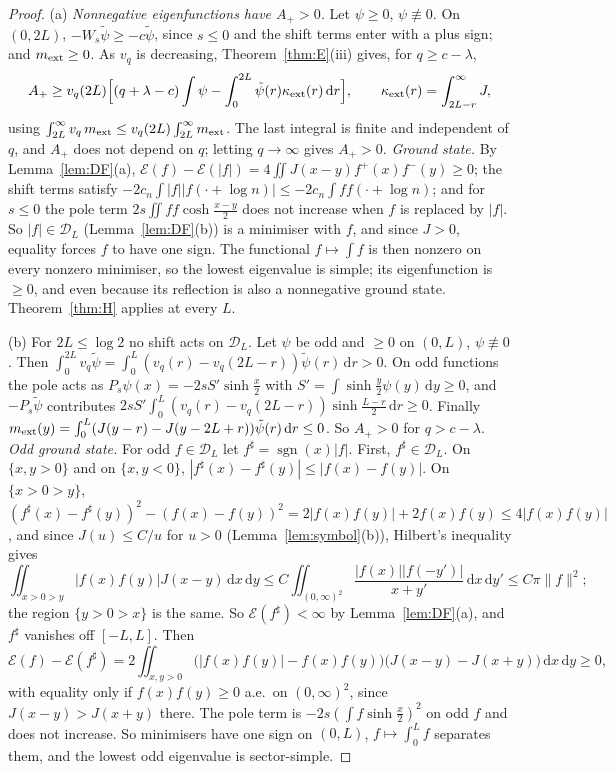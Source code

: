 \documentclass[11pt]{amsart}
\newcommand{\cE}{\mathcal{E}}
\newcommand{\dd}{\,\mathrm{d}}
\DeclareMathOperator{\sgn}{sgn}
\theoremstyle{definition}
\theoremstyle{remark}
\numberwithin{equation}{section}
\begin{document}
\begin{proof}
(a) \emph{Nonnegative eigenfunctions have $A_+>0$.} Let $\psi\ge0$, $\psi\not\equiv0$. On $(0,2L)$, $-W_s\tilde\psi\ge-c\tilde\psi$, since $s\le0$ and the shift terms enter with a plus sign; and $m_{\rm ext}\ge0$. As $v_q$ is decreasing, Theorem~\ref{thm:E}(iii) gives, for $q\ge c-\lambda$,
\[
A_+\ge v_q(2L)\Bigl[(q+\lambda-c)\int\psi-\int_0^{2L}\tilde\psi(r)\kappa_{\rm ext}(r)\dd r\Bigr],\qquad\kappa_{\rm ext}(r)=\int_{2L-r}^\infty J,
\]
using $\int_{2L}^\infty v_q\,m_{\rm ext}\le v_q(2L)\int_{2L}^\infty m_{\rm ext}$. The last integral is finite and independent of $q$, and $A_+$ does not depend on $q$; letting $q\to\infty$ gives $A_+>0$. \emph{Ground state.} By Lemma~\ref{lem:DF}(a), $\cE(f)-\cE(|f|)=4\iint J(x-y)f^+(x)f^-(y)\ge0$; the shift terms satisfy $-2c_n\int|f||f(\cdot+\log n)|\le-2c_n\int ff(\cdot+\log n)$; and for $s\le0$ the pole term $2s\iint ff\cosh\frac{x-y}2$ does not increase when $f$ is replaced by $|f|$. So $|f|\in \mathcal D_L$ (Lemma~\ref{lem:DF}(b)) is a minimiser with $f$, and since $J>0$, equality forces $f$ to have one sign. The functional $f\mapsto\int f$ is then nonzero on every nonzero minimiser, so the lowest eigenvalue is simple; its eigenfunction is $\ge0$, and even because its reflection is also a nonnegative ground state. Theorem~\ref{thm:H} applies at every $L$.

(b) For $2L\le\log2$ no shift acts on $\mathcal D_L$. Let $\psi$ be odd and $\ge0$ on $(0,L)$, $\psi\not\equiv0$. Then $\int_0^{2L}v_q\tilde\psi=\int_0^L(v_q(r)-v_q(2L-r))\tilde\psi(r)\dd r>0$. On odd functions the pole acts as $P_s\psi(x)=-2sS'\sinh\frac x2$ with $S'=\int\sinh\frac y2\psi(y)\dd y\ge0$, and $-P_s\tilde\psi$ contributes $2sS'\int_0^L(v_q(r)-v_q(2L-r))\sinh\frac{L-r}2\dd r\ge0$. Finally $m_{\rm ext}(y)=\int_0^L(J(y-r)-J(y-2L+r))\tilde\psi(r)\dd r\le0$. So $A_+>0$ for $q>c-\lambda$. \emph{Odd ground state.} For odd $f\in\mathcal D_L$ let $f^\sharp=\sgn(x)|f|$. First, $f^\sharp\in\mathcal D_L$. On $\{x,y>0\}$ and on $\{x,y<0\}$, $|f^\sharp(x)-f^\sharp(y)|\le|f(x)-f(y)|$. On $\{x>0>y\}$, $(f^\sharp(x)-f^\sharp(y))^2-(f(x)-f(y))^2=2|f(x)f(y)|+2f(x)f(y)\le4|f(x)f(y)|$, and since $J(u)\le C/u$ for $u>0$ (Lemma~\ref{lem:symbol}(b)), Hilbert's inequality gives
\[
\iint_{x>0>y}|f(x)f(y)|J(x-y)\dd x\dd y\le C\iint_{(0,\infty)^2}\frac{|f(x)||f(-y')|}{x+y'}\dd x\dd y'\le C\pi\|f\|^2 ;
\]
the region $\{y>0>x\}$ is the same. So $\cE(f^\sharp)<\infty$ by Lemma~\ref{lem:DF}(a), and $f^\sharp$ vanishes off $[-L,L]$. Then
\[
\cE(f)-\cE(f^\sharp)=2\iint_{x,y>0}\bigl(|f(x)f(y)|-f(x)f(y)\bigr)\bigl(J(x-y)-J(x+y)\bigr)\dd x\dd y\ge0,
\]
with equality only if $f(x)f(y)\ge0$ a.e.\ on $(0,\infty)^2$, since $J(x-y)>J(x+y)$ there. The pole term is $-2s(\int f\sinh\frac x2)^2$ on odd $f$ and does not increase. So minimisers have one sign on $(0,L)$, $f\mapsto\int_0^Lf$ separates them, and the lowest odd eigenvalue is sector-simple.


\end{proof}
\end{document}
